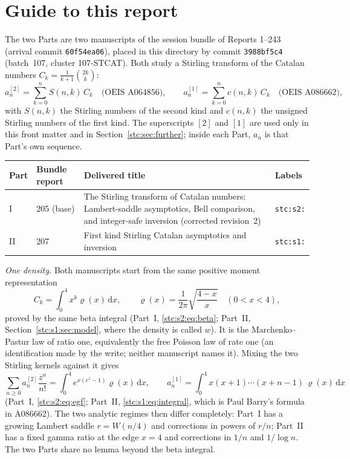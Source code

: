 \documentclass[11pt,letterpaper]{article}
\numberwithin{equation}{section}
\theoremstyle{remark}\newtheorem{remark}[theorem]{Remark}
\newcommand{\dd}{\,\mathrm d}
\begin{document}
\section*{Guide to this report}\label{stc:sec:guide}
The two Parts are two manuscripts of the session bundle of Reports 1--243 (arrival commit \texttt{60f54ea06}), placed in this directory by commit \texttt{3988bf5c4} (batch~107, cluster 107-STCAT). Both study a Stirling transform of the Catalan numbers $C_k=\frac1{k+1}\binom{2k}k$:
\[
 a^{[2]}_n=\sum_{k=0}^nS(n,k)\,C_k\quad\text{(OEIS A064856)},\qquad
 a^{[1]}_n=\sum_{k=0}^nc(n,k)\,C_k\quad\text{(OEIS A086662)},
\]
with $S(n,k)$ the Stirling numbers of the second kind and $c(n,k)$ the unsigned Stirling numbers of the first kind. The superscripts $[2]$ and $[1]$ are used only in this front matter and in Section~\ref{stc:sec:further}; inside each Part, $a_n$ is that Part's own sequence.
\begin{center}
\small
\begin{tabular}{@{}l l >{\raggedright\arraybackslash}p{} l@{}}
\toprule
Part & Bundle report & Delivered title & Labels\\
\midrule
I & 205 (base) & The Stirling transform of Catalan numbers: Lambert-saddle asymptotics, Bell comparison, and integer-safe inversion (corrected revision~2) & \texttt{stc:s2:}\\
II & 207 & First kind Stirling Catalan asymptotics and inversion & \texttt{stc:s1:}\\
\bottomrule
\end{tabular}
\end{center}
\emph{One density.} Both manuscripts start from the same positive moment representation
\[
 C_k=\int_0^4x^k\varrho(x)\dd x,\qquad \varrho(x)=\frac1{2\pi}\sqrt{\frac{4-x}{x}}\quad(0<x<4),
\]
proved by the same beta integral (Part~I, \eqref{stc:s2:eq:beta}; Part~II, Section~\ref{stc:s1:sec:model}, where the density is called $w$). It is the Marchenko--Pastur law of ratio one, equivalently the free Poisson law of rate one (an identification made by the write; neither manuscript names it). Mixing the two Stirling kernels against it gives
\[
 \sum_{n\ge0}a^{[2]}_n\frac{z^n}{n!}=\int_0^4e^{x(e^z-1)}\varrho(x)\dd x,\qquad
 a^{[1]}_n=\int_0^4x(x+1)\cdots(x+n-1)\,\varrho(x)\dd x
\]
(Part~I, \eqref{stc:s2:eq:egf}; Part~II, \eqref{stc:s1:eq:integral}, which is Paul Barry's formula in A086662). The two analytic regimes then differ completely: Part~I has a growing Lambert saddle $r=W(n/4)$ and corrections in powers of $r/n$; Part~II has a fixed gamma ratio at the edge $x=4$ and corrections in $1/n$ and $1/\log n$. The two Parts share no lemma beyond the beta integral.
\end{document}
